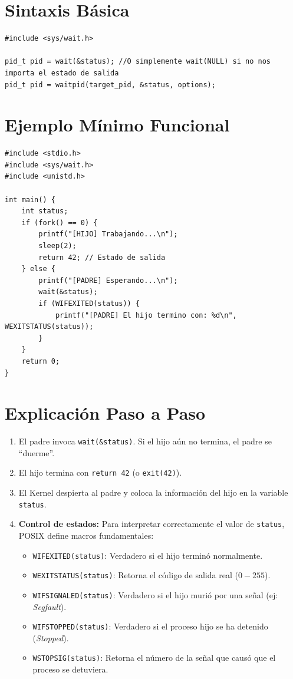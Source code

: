 \documentclass[12pt,a4paper]{article}
\begin{document}
\section{Sintaxis Básica}
\begin{lstlisting}[numbers=none]
#include <sys/wait.h>

pid_t pid = wait(&status); //O simplemente wait(NULL) si no nos importa el estado de salida
pid_t pid = waitpid(target_pid, &status, options);
\end{lstlisting}

\section{Ejemplo Mínimo Funcional}
\begin{lstlisting}
#include <stdio.h>
#include <sys/wait.h>
#include <unistd.h>

int main() {
    int status;
    if (fork() == 0) {
        printf("[HIJO] Trabajando...\n");
        sleep(2);
        return 42; // Estado de salida
    } else {
        printf("[PADRE] Esperando...\n");
        wait(&status);
        if (WIFEXITED(status)) {
            printf("[PADRE] El hijo termino con: %d\n", WEXITSTATUS(status));
        }
    }
    return 0;
}
\end{lstlisting}

\section{Explicación Paso a Paso}
\begin{enumerate}
    \item El padre invoca \texttt{wait(\&status)}. Si el hijo aún no termina, el padre se ``duerme''.
    \item El hijo termina con \texttt{return 42} (o \texttt{exit(42)}).
    \item El Kernel despierta al padre y coloca la información del hijo en la variable \texttt{status}.
    \item \textbf{Control de estados:} Para interpretar correctamente el valor de \texttt{status}, POSIX define macros fundamentales:
    \begin{itemize}
        \item \texttt{WIFEXITED(status)}: Verdadero si el hijo terminó normalmente.
        \item \texttt{WEXITSTATUS(status)}: Retorna el código de salida real ($0-255$).
        \item \texttt{WIFSIGNALED(status)}: Verdadero si el hijo murió por una señal (ej: \textit{Segfault}).
        \item \texttt{WIFSTOPPED(status)}: Verdadero si el proceso hijo se ha detenido (\textit{Stopped}).
        \item \texttt{WSTOPSIG(status)}: Retorna el número de la señal que causó que el proceso se detuviera.
    \end{itemize}
\end{enumerate}
\end{document}
